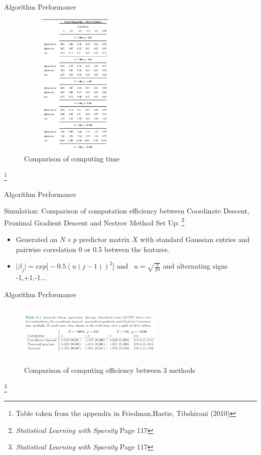 \documentclass{beamer}
\begin{document}
\begin{frame}{Algorithm Performance}
\begin{figure}[h]
\centering
\includegraphics[width=5.5cm,height=7cm]{img/table1}
\caption{Comparison of computing time}
\end{figure}
\footnote{Table taken from the appendix in Friedman,Hastie, Tibshirani (2010) }
\end{frame}

\begin{frame}{Algorithm Performance}
\begin{block}{Simulation: Comparison of computation efficiency between Coordinate Descent, Proximal Gradient Descent and Nestrov Method}
\vspace*{3mm}
Set Up: \footnote{\textit{Statistical Learning with Sparsity} Page 117}
\begin{itemize}
    \item Generated an \(N \times p\) predictor matrix $X$ with standard Gaussian entries and pairwise correlation 0 or 0.5 between the features.
    \vspace*{3mm}
    \item \(\lvert \beta_j \rvert =exp \big[ -0.5(u(j-1))^2\big] \) and \ 
    \(u=\sqrt{\frac{\pi}{20}}\) and alternating signs -1,+1,-1...
\end{itemize}
\end{block}
\end{frame}

\begin{frame}{Algorithm Performance}
\begin{figure}[h]
\centering
\includegraphics[width=7cm,height=3cm]{img/table2}
\caption{Comparison of computing efficiency between 3 methods}
\end{figure}
 \footnote{\textit{Statistical Learning with Sparsity} Page 117}  
\end{frame}
\end{document}
